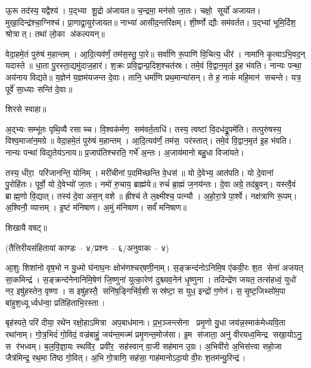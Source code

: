  ऊ॒रू तद॑स्य॒ यद्वैश्य॑। प॒द्भ्या शू॒द्रो अ॑जायत॥ च॒न्द्रमा॒ मन॑सो जा॒तः। चक्षो॒ सूर्यो॑ अजायत। मुखा॒दिन्द्र॑श्चा॒ग्निश्च॑। प्रा॒णाद्वा॒युर॑जायत॥ नाभ्या॑ आसीद॒न्तरि॑क्षम्। शी॒र्ष्णो द्यौः सम॑वर्तत। प॒द्भ्यां भूमि॒र्दिश॒ श्रोत्रात्। तथा॑ लो॒का अ॑कल्पयन्॥

 वेदा॒हमे॒तं पुरु॑षं म॒हान्तम्। आ॒दि॒त्यव॑र्णं॒ तम॑स॒स्तु॒ पा॒रे॥ सर्वा॑णि रू॒पाणि॑ वि॒चित्य॒ धीर॑। नामा॑नि कृ॒त्वाऽभि॒वद॒न् यदास्ते॥ धा॒ता पु॒रस्ता॒द्यमु॑दाज॒हार॑। श॒क्रः प्रवि॒द्वान्प्र॒दिश॒श्चत॑स्रः। तमे॒वं वि॒द्वान॒मृत॑ इ॒ह भ॑वति। नान्यः पन्था॒ अय॑नाय विद्यते॥ य॒ज्ञेन॑ य॒ज्ञम॑यजन्त दे॒वाः। तानि॒ धर्मा॑णि प्रथ॒मान्या॑सन्। ते ह॒ नाकं॑ महि॒मान॑ सचन्ते। यत्र॒ पूर्वे॑ सा॒ध्याः सन्ति॑ दे॒वाः॥ 

शिरसे स्वाहा॥

{\small \closesection}


अ॒द्भ्यः सम्भू॑तः पृथि॒व्यै रसाच्च। वि॒श्वक॑र्मण॒ सम॑वर्त॒ताधि॑। तस्य॒ त्वष्टा॑ वि॒दध॑द्रू॒पमे॑ति। तत्पुरु॑षस्य॒ विश्व॒माजा॑न॒मग्रे॥ वेदा॒हमे॒तं पुरु॑षं म॒हान्तम्। आ॒दि॒त्यव॑र्णं॒ तम॑स॒ पर॑स्तात्। तमे॒वं वि॒द्वान॒मृत॑ इ॒ह भ॑वति। नान्यः पन्था॑ विद्य॒तेय॑ऽनाय॥ प्र॒जाप॑तिश्चरति॒ गर्भे॑ अ॒न्तः। अ॒जाय॑मानो बहु॒धा विजा॑यते। 

तस्य॒ धीरा॒ परि॑जानन्ति॒ योनिम्। मरी॑चीनां प॒दमि॑च्छन्ति वे॒धस॑॥ यो दे॒वेभ्य॒ आत॑पति। यो दे॒वानां पु॒रोहि॑तः। पूर्वो॒ यो दे॒वेभ्यो॑ जा॒तः। नमो॑ रु॒चाय॒ ब्राह्म॑ये॥ रुचं॑ ब्रा॒ह्मं ज॒नय॑न्तः। दे॒वा अग्रे॒ तद॑ब्रुवन्। यस्त्वै॒वं ब्राह्म॒णो वि॒द्यात्। तस्य॑ दे॒वा अस॒न् वशे॥ ह्रीश्च॑ ते ल॒क्ष्मीश्च॒ पत्न्यौ। अ॒हो॒रा॒त्रे पा॒र्श्वे। नक्ष॑त्राणि रू॒पम्। अ॒श्विनौ॒ व्यात्तम्। इ॒ष्टं म॑निषाण। अ॒मुं म॑निषाण। सर्वं॑ मनिषाण॥ 

शिखायै वषट्॥

{\small \closesection}
\centerline{\normalsize (तैत्तिरीयसंहितायां काण्डः – ४/प्रश्नः – ६/अनुवाकः – ४)}

आ॒शुः शिशा॑नो वृष॒भो न यु॒ध्मो घ॑नाघ॒नः क्षोभ॑णश्चर्‌षणी॒नाम्। स॒ङ्क्रन्द॑नोऽनिमि॒ष ए॑कवी॒रः श॒त सेना॑ अजयत् सा॒कमिन्द्र॑। स॒ङ्क्रन्द॑नेनानिमि॒षेण॑ जि॒ष्णुना॑ युत्का॒रेण॑ दुश्च्यव॒नेन॑ धृ॒ष्णुना। तदिन्द्रे॑ण जयत॒ तत्स॑हध्वं॒ युधो॑ नर॒ इषु॑हस्तेन॒ वृष्णा। स इषु॑हस्तै॒ सनि॑ष॒ङ्गिभि॑र्व॒शी सस्र॑ष्टा॒ स युध॒ इन्द्रो॑ ग॒णेन॑। स॒सृ॒ष्ट॒जिथ्सो॑म॒पा बा॑हुश॒ध्यूर्ध्वध॑न्वा॒ प्रति॑हिताभि॒रस्ता।

बृह॑स्पते॒ परि॑ दीया॒ रथे॑न रक्षो॒हाऽमित्रा अप॒बाध॑मानः। प्र॒भ॒ञ्जन्त्सेना प्रमृ॒णो यु॒धा जय॑न्न॒स्माक॑मेध्यवि॒ता रथा॑नाम्। गो॒त्र॒भिदं॑ गो॒विदं॒ वज्र॑बाहुं॒ जय॑न्त॒मज्म॑ प्रमृ॒णन्त॒मोज॑सा। इ॒म स॑जाता॒ अनु॑ वीरयध्व॒मिन्द्र सखा॒योऽनु॒ स र॑भध्वम्। ब॒ल॒वि॒ज्ञा॒यः स्थवि॑र॒ प्रवी॑र॒ सह॑स्वान् वा॒जी सह॑मान उ॒ग्रः। अ॒भिवी॑रो अ॒भिस॑त्त्वा सहो॒जा जैत्र॑मिन्द्र॒ रथ॒मा ति॑ष्ठ गो॒वित्। अ॒भि गो॒त्राणि॒ सह॑सा॒ गाह॑मानोऽदा॒यो वी॒रः श॒तम॑न्यु॒रिन्द्र॑।

